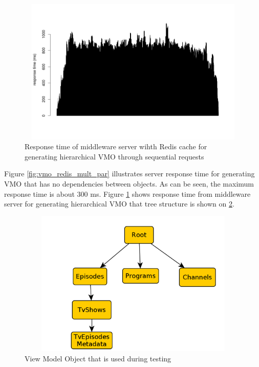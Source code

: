\begin{figure}[h!]
    \centering
    \includegraphics[width=15cm,height=7cm,keepaspectratio]{images/vmo_redis_mult_seq.png}
    \caption{Response time of middleware server wihth Redis cache for generating hierarchical VMO through sequential requests}
    \label{fig:vmo_redis_mult_seq}
\end{figure}

Figure \ref{fig:vmo_redis_mult_par} illustrates server response time for generating VMO that has no dependencies between objects. As can be seen, the maximum response time is about 300 ms. Figure \ref{fig:vmo_redis_mult_seq} shows response time from middleware server for generating hierarchical VMO that tree structure is shown on \ref{fig:vmo_test_example}. 

\begin{figure}[h!]
    \centering
    \includegraphics[width=15cm,height=7cm,keepaspectratio]{images/vmo_test_example.png}
    \caption{View Model Object that is used during testing}
    \label{fig:vmo_test_example}
\end{figure}


